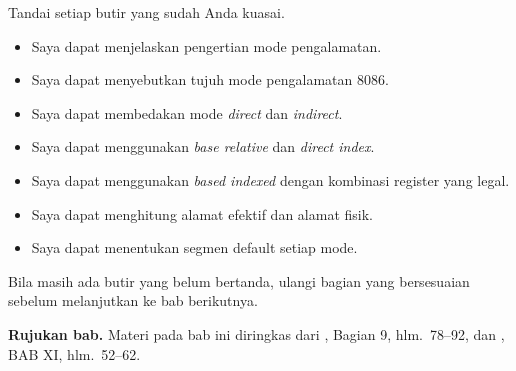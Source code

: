 \begin{checklistbox}
\vspace{1.1em}
Tandai setiap butir yang sudah Anda kuasai.

\begin{itemize}
    \item[\checkbox] Saya dapat menjelaskan pengertian mode
          pengalamatan.
    \item[\checkbox] Saya dapat menyebutkan tujuh mode pengalamatan
          8086.
    \item[\checkbox] Saya dapat membedakan mode \textit{direct} dan
          \textit{indirect}.
    \item[\checkbox] Saya dapat menggunakan \textit{base relative}
          dan \textit{direct index}.
    \item[\checkbox] Saya dapat menggunakan \textit{based indexed}
          dengan kombinasi register yang legal.
    \item[\checkbox] Saya dapat menghitung alamat efektif dan alamat
          fisik.
    \item[\checkbox] Saya dapat menentukan segmen default setiap mode.
\end{itemize}

\vspace{0.4em}
Bila masih ada butir yang belum bertanda, ulangi bagian yang
bersesuaian sebelum melanjutkan ke bab berikutnya.
\end{checklistbox}

\begin{infobox}
\vspace{1.1em}
\textbf{Rujukan bab.} Materi pada bab ini diringkas dari
\cite{gunawan2019}, Bagian 9, hlm.~78--92, dan \cite{sto2001},
BAB XI, hlm.~52--62.
\end{infobox}
